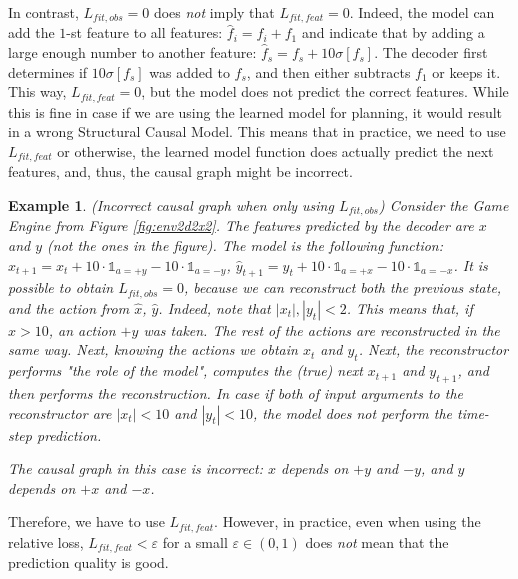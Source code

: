 \documentclass[a4paper,11pt,oneside]{report}
\newtheorem{example}{Example}[section]
\begin{document}
In contrast, $L_{fit,obs}=0$ does {\em not} imply that $L_{fit, feat}=0$. Indeed, the model can add the $1$-st feature to all features: $\hat{f}_i=f_i+f_1$ and indicate that by adding a large enough number to another feature: $\hat{f}_s=f_s+10\sigma[f_s]$. The decoder first determines if $10\sigma[f_s]$ was added to $f_s$, and then either subtracts $f_1$ or keeps it. This way, $L_{fit, feat}=0$, but the model does not predict the correct features. While this is fine in case if we are using the learned model for planning, it would result in a wrong Structural Causal Model. This means that in practice, we need to use $L_{fit,feat}$ or otherwise, the learned model function does actually predict the next features, and, thus, the causal graph might be incorrect.

\begin{example}{(Incorrect causal graph when only using $L_{fit, obs}$)}
    Consider the Game Engine from Figure \ref{fig:env2d2x2}. The features predicted by the decoder are $x$ and $y$ (not the ones in the figure).
    The model is the following function: $\hat{x}_{t+1}=x_t+10\cdot\mathds 1_{a=+y}-10\cdot\mathds 1_{a=-y}$, $\hat{y}_{t+1}=y_t+10\cdot\mathds 1_{a=+x}-10\cdot\mathds 1_{a=-x}$.
    It is possible to obtain $L_{fit, obs}=0$, because we can reconstruct both the previous state, and the action from $\hat{x}$, $\hat{y}$. Indeed, note that $|x_t|,|y_t|<2$. This means that, if $\hat{x}>10$, an action $+y$ was taken. The rest of the actions are reconstructed in the same way.
    Next, knowing the actions we obtain $x_t$ and $y_t$. Next, the reconstructor performs "the role of the model", computes the (true) next $x_{t+1}$ and $y_{t+1}$, and then performs the reconstruction.
    In case if both of input arguments to the reconstructor are $|x_t|<10$ and $|y_t|<10$, the model does not perform the time-step prediction.

    The causal graph in this case is incorrect: $x$ depends on $+y$ and $-y$, and $y$ depends on $+x$ and $-x$.
\end{example}

Therefore, we have to use $L_{fit,feat}$. However, in practice, even when using the relative loss, $L_{fit, feat}<\varepsilon$ for a small $\varepsilon\in(0,1)$ does {\em not} mean that the prediction quality is good.
\end{document}
